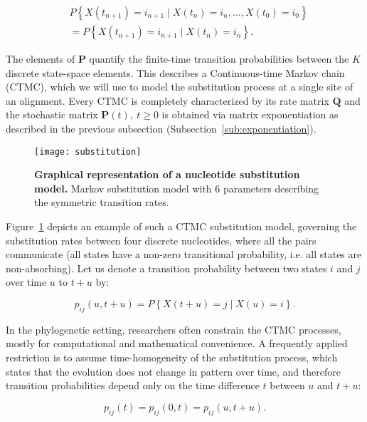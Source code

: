 \begin{align}
& P\left\{ X(t_{n+1}) = i_{n+1}\mid X(t_{n})=i_{n},\ldots, X(t_{0})=i_{0}\right\}   \nonumber \\
&= P\left\{ X(t_{n+1}) = i_{n+1}\mid X(t_{n})=i_{n}\right\} .
\label{eq:markov}
\end{align}

The elements of $\mathbf{P}$ quantify the finite-time transition probabilities between the $K$ discrete state-space elements.
This describes a Continuous-time Markov chain (CTMC), which  we will use to model the substitution process at a single site of an alignment.
Every CTMC is completely characterized by its rate matrix $\mathbf{Q}$ and the stochastic matrix $\mathbf{P}(t),\ t\geq0$ is obtained via matrix exponentiation as described in the previous subsection (Subsection~\ref{sub:exponentiation}).

\begin{figure}[h!]
\centering
\texttt{[image: substitution]} 
\caption{
{ \footnotesize 
{\bf  Graphical representation of a nucleotide substitution model.} 
Markov substitution model with 6 parameters describing the symmetric transition rates.
} %
}
\label{fig:substitution}
\end{figure}

Figure~\ref{fig:substitution} depicts an example of such a CTMC substitution model, governing the substitution rates between four discrete nucleotides, where all the pairs communicate (all states have a non-zero transitional probability, i.e. all states are non-absorbing).
Let us denote a transition probability between two states $i$ and $j$ over time $u$ to $t+u$ by:

\begin{equation}
p_{ij}\left(u,t+u\right)=P\left\{ X(t+u)=j\mid X(u)=i\right\} .
\end{equation}

In the phylogenetic setting, researchers often constrain the CTMC processes, mostly for computational and mathematical convenience.
A frequently applied restriction is to assume time-homogeneity of the substitution process, which states that the evolution does not change in pattern over time, and therefore transition probabilities depend only on the time difference $t$ between $u$ and $t + u$:

\begin{equation}
p_{ij}\left(t\right) = p_{ij}\left(0,t\right) = p_{ij}\left(u,t+u\right).
\label{eq:time_homogeneity}
\end{equation}

